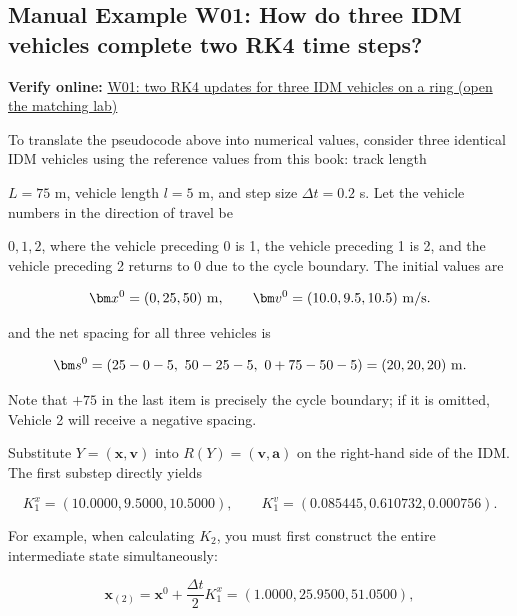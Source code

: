 \documentclass[11pt,a4paper,openany]{book}
\numberwithin{equation}{chapter}
\numberwithin{figure}{chapter}
\numberwithin{table}{chapter}
\newcommand{\onlinelab}[2]{%
  \par\smallskip\noindent
  {\small\sffamily\color{teal}\textbf{Verify online: }\href{https://cwan-ucr.github.io/traffic-stability-book/lab/?case=#1}{#2 (open the matching lab)}}%
  \par\smallskip}
\begin{document}
\subsection{Manual Example W01: How do three IDM vehicles complete two RK4 time steps?}\label{sub:worked-micro-rk4}
\onlinelab{W01}{W01: two RK4 updates for three IDM vehicles on a ring}




To translate the pseudocode above into numerical values, consider three identical IDM vehicles using the reference values ​​from this book: track length

$L=75$ m, vehicle length $l=5$ m, and step size $\Delta t=0.2$ s. Let the vehicle numbers in the direction of travel be

$0,1,2$, where the vehicle preceding 0 is 1, the vehicle preceding 1 is 2, and the vehicle preceding 2 returns to 0 due to the cycle boundary. The initial values ​​are

\begin{equation}
\bm x^0=(0,25,50)\ {\rm m},\qquad
\bm v^0=(10.0,9.5,10.5)\ {\rm m/s}.
\label{eq:w01-initial}
\end{equation}

and the net spacing for all three vehicles is

\[
\bm s^0=(25-0-5,\ 50-25-5,\ 0+75-50-5)=(20,20,20)\ {\rm m}.
\]




Note that $+75$ in the last item is precisely the cycle boundary; if it is omitted, Vehicle 2 will receive a negative spacing.













Substitute $Y=(\bm x,\bm v)$ into $R(Y)=(\bm v,\bm a)$ on the right-hand side of the IDM. The first substep directly yields




\begin{equation}
K_1^x=(10.0000,9.5000,10.5000),\qquad
K_1^v=(0.085445,0.610732,0.000756).
\label{eq:w01-k1}
\end{equation}




For example, when calculating $K_2$, you must first construct the entire intermediate state simultaneously:




\[
\bm x_{(2)}=\bm x^0+\frac{\Delta t}{2}K_1^x=(1.0000,25.9500,51.0500),
\]
\end{document}
